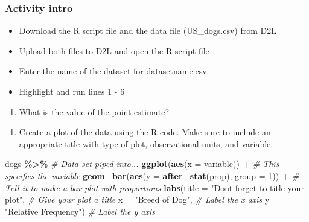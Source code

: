 \documentclass[
]{report}
\newenvironment{Shaded}{\begin{snugshade}}{\end{snugshade}}
\newcommand{\AttributeTok}[1]{\textcolor[rgb]{0.13,0.29,0.53}{#1}}
\newcommand{\CommentTok}[1]{\textcolor[rgb]{0.56,0.35,0.01}{\textit{#1}}}
\newcommand{\DecValTok}[1]{\textcolor[rgb]{0.00,0.00,0.81}{#1}}
\newcommand{\FunctionTok}[1]{\textcolor[rgb]{0.13,0.29,0.53}{\textbf{#1}}}
\newcommand{\NormalTok}[1]{#1}
\newcommand{\SpecialCharTok}[1]{\textcolor[rgb]{0.81,0.36,0.00}{\textbf{#1}}}
\newcommand{\StringTok}[1]{\textcolor[rgb]{0.31,0.60,0.02}{#1}}
\providecommand{\tightlist}{%
  \setlength{\itemsep}{0pt}\setlength{\parskip}{0pt}}
\begin{document}
\subsubsection*{Activity intro}\label{activity-intro-1}

\begin{itemize}
\item
  Download the R script file and the data file (US\_dogs.csv) from D2L
\item
  Upload both files to D2L and open the R script file
\item
  Enter the name of the dataset for datasetname.csv.
\item
  Highlight and run lines 1 - 6
\end{itemize}

\begin{enumerate}
\def\labelenumi{\arabic{enumi}.}
\tightlist
\item
  What is the value of the point estimate?
\end{enumerate}

\vspace{0.3in}

\begin{enumerate}
\def\labelenumi{\arabic{enumi}.}
\setcounter{enumi}{1}
\tightlist
\item
  Create a plot of the data using the R code. Make sure to include an appropriate title with type of plot, observational units, and variable.
\end{enumerate}

\begin{Shaded}
\begin{Highlighting}[]
\NormalTok{dogs }\SpecialCharTok{\%\textgreater{}\%} \CommentTok{\# Data set piped into...}
    \FunctionTok{ggplot}\NormalTok{(}\FunctionTok{aes}\NormalTok{(}\AttributeTok{x =}\NormalTok{ variable)) }\SpecialCharTok{+}   \CommentTok{\# This specifies the variable}
    \FunctionTok{geom\_bar}\NormalTok{(}\FunctionTok{aes}\NormalTok{(}\AttributeTok{y =} \FunctionTok{after\_stat}\NormalTok{(prop), }\AttributeTok{group =} \DecValTok{1}\NormalTok{)) }\SpecialCharTok{+}  \CommentTok{\# Tell it to make a bar plot with proportions}
    \FunctionTok{labs}\NormalTok{(}\AttributeTok{title =} \StringTok{"Don\textquotesingle{}t forget to title your plot"}\NormalTok{,  }
       \CommentTok{\# Give your plot a title}
       \AttributeTok{x =} \StringTok{"Breed of Dog"}\NormalTok{,   }\CommentTok{\# Label the x axis}
       \AttributeTok{y =} \StringTok{"Relative Frequency"}\NormalTok{)  }\CommentTok{\# Label the y axis}
\end{Highlighting}
\end{Shaded}
\end{document}
